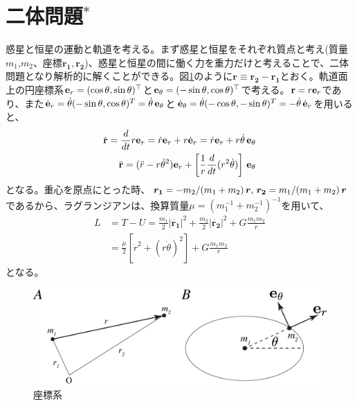\section{二体問題$^\ast$ \label{ss:twobody}}

惑星と恒星の運動と軌道を考える。まず惑星と恒星をそれぞれ質点と考え(質量$m_1$,$m_2$、座標${\boldsymbol{r_1}},{\boldsymbol{ r_2}}$)、惑星と恒星の間に働く力を重力だけと考えることで、二体問題となり解析的に解くことができる。図\ref{fig:zahyou}のように${\boldsymbol{ r}} \equiv {\boldsymbol{r_2}} - {\boldsymbol{ r_1}}$とおく。軌道面上の円座標系${\bf e}_r=(\cos{\theta}, \sin{\theta})^\top$と${\bf e}_\theta=(-\sin{\theta}, \cos{\theta})^\top$で考える。${\bf r} = r {\bf e}_r$であり、また$\dot{{\bf e}}_r=\dot{\theta} (-\sin{\theta}, \cos{\theta})^T = \dot{\theta} \, {\bf e}_\theta $と$\dot{{\bf e}}_\theta=\dot{\theta}(-\cos{\theta}, -\sin{\theta})^T = - \dot{\theta} \, \dot{{\bf e}}_r$を用いると、
\begin{align}
\label{eq:speconv1}
\dot{\bf r} = \frac{d}{dt}{r {\bf e}_r} = \dot{r} {\bf e}_r + r \dot{{\bf e}}_r =  \dot{r} {\bf e}_r + r \dot{\theta} \, {\bf e}_\theta \\
\ddot{\bf r} = (\ddot{r} - r \dot{\theta}^2 ) {\bf e}_r + \left[ \frac{1}{r} \frac{d}{dt} (r^2 \dot{\theta} ) \right] \, {\bf e}_\theta
\end{align}
となる。重心を原点にとった時、$\boldsymbol{r_1}=-m_2/(m_1+m_2) \, \boldsymbol{r}, \, \boldsymbol{r_2}= m_1/(m_1 + m_2) \,\boldsymbol{r}$であるから、ラグランジアンは、換算質量$\mu = (m_1^{-1} + m_2^{-1})^{-1}$を用いて、
\begin{align}
L &= T - U = \frac{m_1}{2} |\dot{\boldsymbol{r_1}}|^2 + \frac{m_2}{2} |\dot{\boldsymbol{r_2}}|^2 + G \frac{m_1 m_2}{r} \nonumber \\
&= \frac{\mu}{2} [ \dot{r}^2 + (r \dot{\theta})^2 ] + G \frac{m_1 m_2}{r}
\end{align}
となる。

\begin{figure}[]
 \begin{center}
	\includegraphics[width=\linewidth]{fig/zahyou.eps}
\end{center}
	\caption{座標系}
	\label{fig:zahyou}
\end{figure} 



